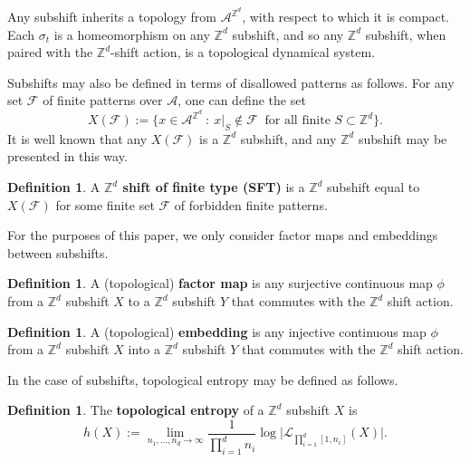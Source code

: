 \documentclass[12pt]{amsart}
\newcommand{\zz}{\mathbb{Z}}
\theoremstyle{definition}
\newtheorem{definition}[theorem]{Definition}
\newcommand{\kmmargin}[1]{\marginpar{\small\textcolor{blue}{[\sl
{#1}\rm]}}}
\begin{document}
Any subshift inherits a topology from $\mathcal{A}^{\mathbb{Z}^d}$, with respect to which it is compact. Each $\sigma_t$ is a homeomorphism on any $\mathbb{Z}^d$ subshift, and so any $\mathbb{Z}^d$ subshift, when paired with the $\mathbb{Z}^d$-shift action, is a topological dynamical system. 

Subshifts may also be defined in terms of disallowed patterns as follows. For any set $\mathcal{F}$ of finite patterns over $\mathcal{A}$, one can define the set %
$$X(\mathcal{F}) := \bigl\{x \in \mathcal{A}^{\mathbb{Z}^d} \ : \ x|_S \notin \mathcal{F} \ \text{ for all finite } S \subset \mathbb{Z}^d \bigr\}.$$
It is well known that any $X(\mathcal{F})$ is a $\mathbb{Z}^d$ subshift, and any $\mathbb{Z}^d$ subshift may be presented in this way. 

\begin{definition}
A \textbf{$\mathbb{Z}^d$ shift of finite type (SFT)} is a $\mathbb{Z}^d$ subshift equal to $X(\mathcal{F})$ for some finite set $\mathcal{F}$ of forbidden finite patterns. %
\end{definition}

For the purposes of this paper, we only consider factor maps and embeddings between subshifts.

\begin{definition}
A (topological) \textbf{factor map} is any surjective continuous map $\phi$ from a $\mathbb{Z}^d$ subshift $X$ to a $\mathbb{Z}^d$ subshift $Y$ that commutes with the $\mathbb{Z}^d$ shift action. %
\end{definition}

\begin{definition}
A (topological) \textbf{embedding} is any injective continuous map $\phi$ from a $\mathbb{Z}^d$ subshift $X$ into a $\mathbb{Z}^d$ subshift $Y$ that commutes with the $\mathbb{Z}^d$ shift action. 
\end{definition}

In the case of subshifts, topological entropy may be defined as follows.
\begin{definition}\label{entdef}
The \textbf{topological entropy} of a $\zz^d$ subshift $X$ is
\[
h(X) := \lim_{n_1, \ldots, n_d \rightarrow \infty} \frac{1}{\prod_{i=1}^d n_i} \log \biggl|\mathcal{L} _{\prod_{i=1}^d [1,n_i]}(X) \biggr|.
\]
\end{definition}
\end{document}
